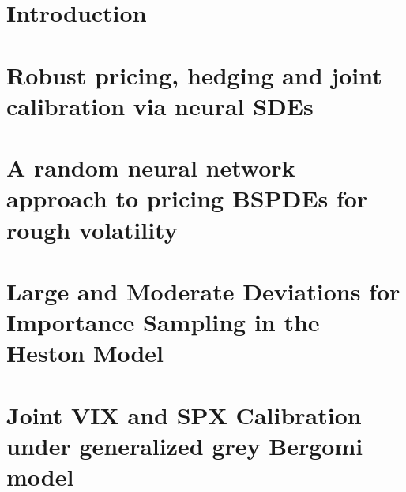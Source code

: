 \chapter{Introduction}



\myclearpage{}
\chapter{Robust pricing, hedging and joint calibration via neural SDEs}
\label{chap:reschap1}
 

\myclearpage{}
\chapter[Random neural networks for rough volatility BSPDEs]{A random neural network approach to pricing BSPDEs for rough volatility}
\label{chap:reschap2}
 

\myclearpage{}
\chapter[Large and Moderate Deviations for Importance Sampling]{Large and Moderate Deviations for Importance Sampling in the Heston Model}
\label{chap:reschap3}
 

\myclearpage{}
\chapter[Joint VIX and SPX Calibration under ggBergomi]{Joint VIX and SPX Calibration under generalized grey Bergomi model}
\label{chap:reschap4}
 

% 

% 


